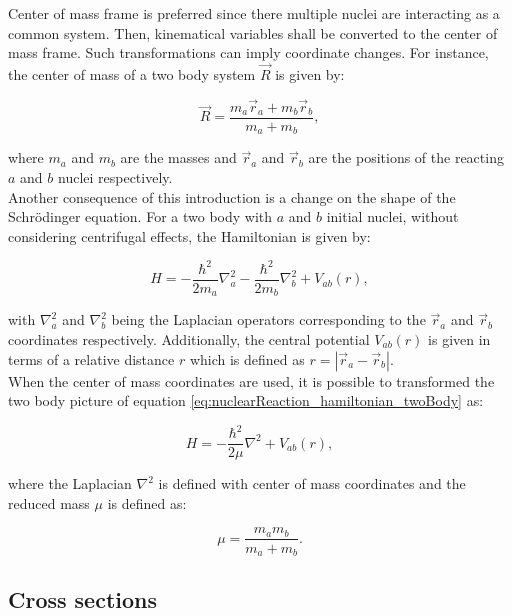 \documentclass[openany]{book}
\begin{document}
Center of mass frame is preferred since there multiple nuclei are interacting as a common system. Then, kinematical variables shall be converted to the center of mass frame. Such transformations can imply coordinate changes. For instance, the center of mass of a two body system $\vec R$ is given by: 

\begin{equation}\label{eq:nuclearReaction_centerOfMass}
	\vec R = \frac{m_a \vec r_a + m_b \vec r_b}{m_a + m_b},
\end{equation}

where $m_a$ and $m_b$ are the masses and $\vec r_a $ and $\vec r_b$ are the positions of the reacting $a$ and $b$ nuclei respectively. \\

Another consequence of this introduction is a change on the shape of the Schrödinger equation. For a two body with $a$ and $b$ initial nuclei, without considering centrifugal effects, the Hamiltonian is given by: 

\begin{equation}\label{eq:nuclearReaction_hamiltonian_twoBody}
	H = - \frac{\hbar^2}{2m_a} \nabla^2_a  - \frac{\hbar^2}{2m_b} \nabla^2_b + V_{ab}(r),
\end{equation}

with $\nabla^2_a$ and   $\nabla^2_b$ being the Laplacian operators corresponding to the  $\vec r_a $ and $\vec r_b$  coordinates respectively. Additionally, the central potential $ V_{ab}(r)$ is given in terms of a relative distance $r$ which is defined as $r = |\vec r_a - \vec r_b|$. \\

When the center of mass coordinates are used, it is possible to transformed the two body picture of equation \ref{eq:nuclearReaction_hamiltonian_twoBody} as: 

\begin{equation}\label{eq:nuclearReaction_hamiltonian_centerMass}
	H = - \frac{\hbar^2}{2\mu} \nabla^2  + V_{ab}(r),
\end{equation}

where the Laplacian $ \nabla^2$ is defined with center of mass coordinates and the reduced mass $\mu$ is defined as: 

\begin{equation}\label{eq:nuclearReaction_reducedMass}
	\mu = \frac{m_a m_b}{m_a + m_b}.
\end{equation}

\subsection{Cross sections} \label{sub:crossSections}
\end{document}
